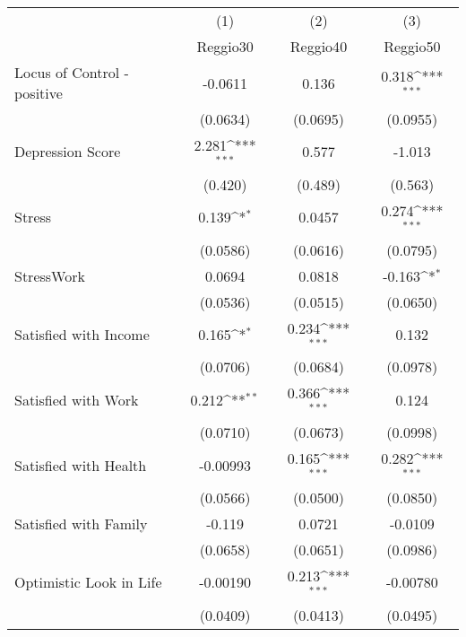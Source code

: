 {
\def\sym#1{\ifmmode^{#1}\else\(^{#1}\)\fi}
\begin{tabular}{l*{3}{c}}
\hline\hline
            &\multicolumn{1}{c}{(1)}&\multicolumn{1}{c}{(2)}&\multicolumn{1}{c}{(3)}\\
            &\multicolumn{1}{c}{Reggio30}&\multicolumn{1}{c}{Reggio40}&\multicolumn{1}{c}{Reggio50}\\
\hline
Locus of Control - positive&     -0.0611         &       0.136         &       0.318\sym{***}\\
            &    (0.0634)         &    (0.0695)         &    (0.0955)         \\
[1em]
Depression Score&       2.281\sym{***}&       0.577         &      -1.013         \\
            &     (0.420)         &     (0.489)         &     (0.563)         \\
[1em]
Stress      &       0.139\sym{*}  &      0.0457         &       0.274\sym{***}\\
            &    (0.0586)         &    (0.0616)         &    (0.0795)         \\
[1em]
StressWork  &      0.0694         &      0.0818         &      -0.163\sym{*}  \\
            &    (0.0536)         &    (0.0515)         &    (0.0650)         \\
[1em]
Satisfied with Income&       0.165\sym{*}  &       0.234\sym{***}&       0.132         \\
            &    (0.0706)         &    (0.0684)         &    (0.0978)         \\
[1em]
Satisfied with Work&       0.212\sym{**} &       0.366\sym{***}&       0.124         \\
            &    (0.0710)         &    (0.0673)         &    (0.0998)         \\
[1em]
Satisfied with Health&    -0.00993         &       0.165\sym{***}&       0.282\sym{***}\\
            &    (0.0566)         &    (0.0500)         &    (0.0850)         \\
[1em]
Satisfied with Family&      -0.119         &      0.0721         &     -0.0109         \\
            &    (0.0658)         &    (0.0651)         &    (0.0986)         \\
[1em]
Optimistic Look in Life&    -0.00190         &       0.213\sym{***}&    -0.00780         \\
            &    (0.0409)         &    (0.0413)         &    (0.0495)         \\

\end{tabular}}
